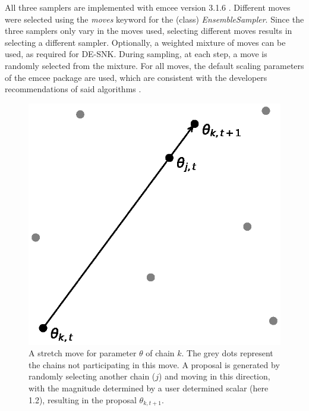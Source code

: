 All three samplers are implemented with emcee version 3.1.6 \citep{foreman2013emcee}. Different moves were selected using the \textit{moves} keyword for the (class) \textit{EnsembleSampler}. Since the three samplers only vary in the moves used, selecting different moves results in selecting a different sampler. Optionally, a weighted mixture of moves can be used, as required for DE-SNK. During sampling, at each step, a move is randomly selected from the mixture. For all moves, the default scaling parameters of the emcee package are used, which are consistent with the developers recommendations of said algorithms \citep{terbraak2006markov, terbraak2008differential, goodman2010ensemble}. 

\begin{figure}[ht]
\centering
\includegraphics[width=1.0\linewidth]{Figures/stretch_move.eps}
\caption{A stretch move for parameter $\theta$ of chain $k$. The grey dots represent the chains not participating in this move. A proposal is generated by randomly selecting another chain ($j$) and moving in this direction, with the magnitude determined by a user determined scalar (here 1.2), resulting in the proposal $\theta_{k,t+1}$.}\label{fig1}
\end{figure}

